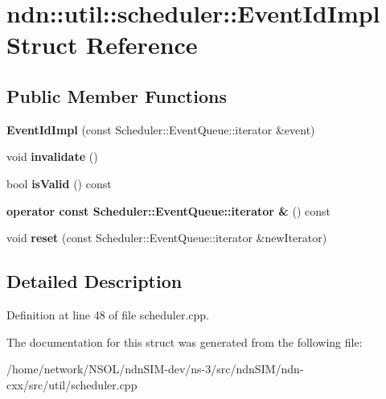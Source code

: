 \hypertarget{structndn_1_1util_1_1scheduler_1_1EventIdImpl}{}\section{ndn\+:\+:util\+:\+:scheduler\+:\+:Event\+Id\+Impl Struct Reference}
\label{structndn_1_1util_1_1scheduler_1_1EventIdImpl}
\subsection*{Public Member Functions}
\begin{DoxyCompactItemize}
\item 
{\bfseries Event\+Id\+Impl} (const Scheduler\+::\+Event\+Queue\+::iterator \&event)\hypertarget{structndn_1_1util_1_1scheduler_1_1EventIdImpl_aec5d0e1c62c72b68d8897a61436ba384}{}\label{structndn_1_1util_1_1scheduler_1_1EventIdImpl_aec5d0e1c62c72b68d8897a61436ba384}

\item 
void {\bfseries invalidate} ()\hypertarget{structndn_1_1util_1_1scheduler_1_1EventIdImpl_a46df4a3c11acb6466c653c41e24cf29d}{}\label{structndn_1_1util_1_1scheduler_1_1EventIdImpl_a46df4a3c11acb6466c653c41e24cf29d}

\item 
bool {\bfseries is\+Valid} () const\hypertarget{structndn_1_1util_1_1scheduler_1_1EventIdImpl_a6536710d4822297a49fd2f9e7dd26cfe}{}\label{structndn_1_1util_1_1scheduler_1_1EventIdImpl_a6536710d4822297a49fd2f9e7dd26cfe}

\item 
{\bfseries operator const Scheduler\+::\+Event\+Queue\+::iterator \&} () const\hypertarget{structndn_1_1util_1_1scheduler_1_1EventIdImpl_a7a0d685b735120037a8aa70599094ed4}{}\label{structndn_1_1util_1_1scheduler_1_1EventIdImpl_a7a0d685b735120037a8aa70599094ed4}

\item 
void {\bfseries reset} (const Scheduler\+::\+Event\+Queue\+::iterator \&new\+Iterator)\hypertarget{structndn_1_1util_1_1scheduler_1_1EventIdImpl_ab071592dace9f4db47714749166985b5}{}\label{structndn_1_1util_1_1scheduler_1_1EventIdImpl_ab071592dace9f4db47714749166985b5}

\end{DoxyCompactItemize}


\subsection{Detailed Description}


Definition at line 48 of file scheduler.\+cpp.



The documentation for this struct was generated from the following file\+:\begin{DoxyCompactItemize}
\item 
/home/network/\+N\+S\+O\+L/ndn\+S\+I\+M-\/dev/ns-\/3/src/ndn\+S\+I\+M/ndn-\/cxx/src/util/scheduler.\+cpp\end{DoxyCompactItemize}
